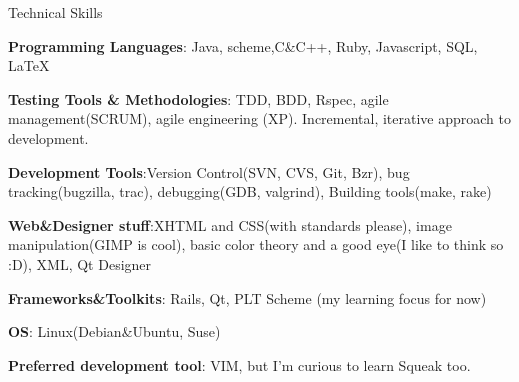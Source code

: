 \begin{rubric}{Technical Skills} 

    \entry* \textbf{Programming Languages}: Java, scheme,C\&C++, Ruby,
    Javascript, SQL, \LaTeX 

    \entry* \textbf{Testing Tools \& Methodologies}: TDD, BDD, Rspec, agile
    management(SCRUM), agile engineering (XP). Incremental, iterative approach to development.
    
    \entry* \textbf{Development Tools}:Version Control(SVN, CVS, Git, Bzr), bug
    tracking(bugzilla, trac), debugging(GDB, valgrind), Building tools(make,
    rake)

    \entry* \textbf{Web\&Designer stuff}:XHTML and CSS(with standards please), image
    manipulation(GIMP is cool), basic color theory and a good eye(I like to
    think so :D), XML, Qt Designer

    \entry* \textbf{Frameworks\&Toolkits}: Rails, Qt, PLT Scheme (my learning
    focus for now) 

    \entry* \textbf{OS}: Linux(Debian\&Ubuntu, Suse)

    \entry* \textbf{Preferred development tool}: VIM, but I'm curious to learn
    Squeak too.  


\end{rubric}
